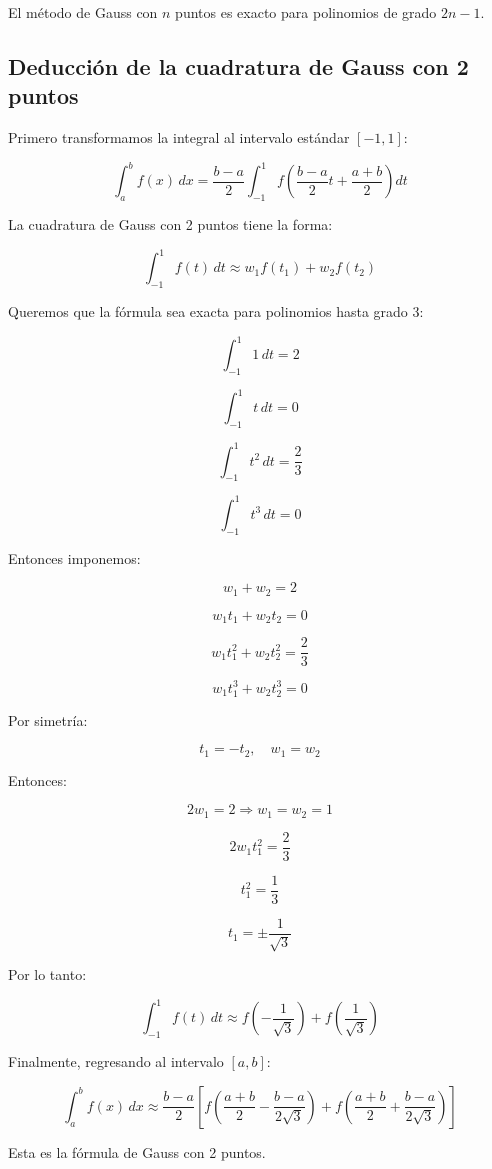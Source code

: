 \documentclass[12pt,a4paper]{article}
\begin{document}
El método de Gauss con $n$ puntos es exacto para polinomios de grado $2n-1$.

\subsection{Deducción de la cuadratura de Gauss con 2 puntos}

Primero transformamos la integral al intervalo estándar $[-1,1]$:

\[
\int_a^b f(x)\,dx =
\frac{b-a}{2} \int_{-1}^{1} f\left(\frac{b-a}{2}t + \frac{a+b}{2}\right) dt
\]

La cuadratura de Gauss con 2 puntos tiene la forma:

\[
\int_{-1}^{1} f(t)\,dt \approx w_1 f(t_1) + w_2 f(t_2)
\]

Queremos que la fórmula sea exacta para polinomios hasta grado 3:

\[
\int_{-1}^{1} 1\,dt = 2
\]

\[
\int_{-1}^{1} t\,dt = 0
\]

\[
\int_{-1}^{1} t^2\,dt = \frac{2}{3}
\]

\[
\int_{-1}^{1} t^3\,dt = 0
\]

Entonces imponemos:

\[
w_1 + w_2 = 2
\]

\[
w_1 t_1 + w_2 t_2 = 0
\]

\[
w_1 t_1^2 + w_2 t_2^2 = \frac{2}{3}
\]

\[
w_1 t_1^3 + w_2 t_2^3 = 0
\]

Por simetría:

\[
t_1 = -t_2, \quad w_1 = w_2
\]

Entonces:

\[
2w_1 = 2 \Rightarrow w_1 = w_2 = 1
\]

\[
2w_1 t_1^2 = \frac{2}{3}
\]

\[
t_1^2 = \frac{1}{3}
\]

\[
t_1 = \pm \frac{1}{\sqrt{3}}
\]

Por lo tanto:

\[
\int_{-1}^{1} f(t)\,dt \approx
f\left(-\frac{1}{\sqrt{3}}\right)
+
f\left(\frac{1}{\sqrt{3}}\right)
\]

Finalmente, regresando al intervalo $[a,b]$:

\[
\int_a^b f(x)\,dx \approx
\frac{b-a}{2}
\left[
f\left(\frac{a+b}{2} - \frac{b-a}{2\sqrt{3}}\right)
+
f\left(\frac{a+b}{2} + \frac{b-a}{2\sqrt{3}}\right)
\right]
\]

Esta es la fórmula de Gauss con 2 puntos.
\end{document}
